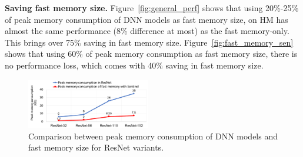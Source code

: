 




\textbf{Saving fast memory size.} 
\textcolor{check}{Figure~\ref{fig:general_perf} shows that using 20\%-25\% of peak memory consumption
of DNN models as fast memory size, \name on HM has almost the same performance (8\% difference at most) as the fast memory-only. 
This brings over 75\% saving in fast memory size.} 
Figure~\ref{fig:fast_memory_sen} shows that using 60\% of peak memory consumption as fast memory size, there is no performance loss, which comes with 40\% saving in fast memory size.


\begin{figure}
\centering
\includegraphics[width=0.48\textwidth]{figures/resnet_diff_input.pdf}
\vspace{-20pt}
\caption{Comparison between peak memory consumption of DNN models and fast memory size for ResNet variants.}
\vspace{-5pt}
\label{fig:mem_consumption}
\end{figure}


